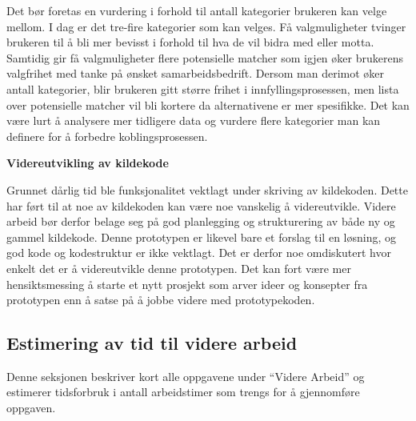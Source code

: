 Det bør foretas en vurdering i forhold til antall kategorier brukeren kan velge mellom. I dag er det tre-fire kategorier som kan velges. Få valgmuligheter tvinger brukeren til å bli mer bevisst i forhold til hva de vil bidra med eller motta. Samtidig gir få valgmuligheter flere potensielle matcher som igjen øker brukerens valgfrihet med tanke på ønsket samarbeidsbedrift. Dersom man derimot øker antall kategorier, blir brukeren gitt større frihet i innfyllingsprosessen, men lista over potensielle matcher vil bli kortere da alternativene er mer spesifikke. Det kan være lurt å analysere mer tidligere data og vurdere flere kategorier man kan definere for å forbedre koblingsprosessen.

{\bf Videreutvikling av kildekode}

Grunnet dårlig tid ble funksjonalitet vektlagt under skriving av kildekoden. Dette har ført til at noe av kildekoden kan være noe vanskelig å videreutvikle. Videre arbeid bør derfor belage seg på god planlegging og strukturering av både ny og gammel kildekode. Denne prototypen er likevel bare et forslag til en løsning, og god kode og kodestruktur er ikke vektlagt. Det er derfor noe omdiskutert hvor enkelt det er å videreutvikle denne prototypen. Det kan fort være mer hensiktsmessing å starte et nytt prosjekt som arver ideer og konsepter fra prototypen enn å satse på å jobbe videre med prototypekoden.

\subsection{Estimering av tid til videre arbeid}

Denne seksjonen beskriver kort alle oppgavene under ``Videre Arbeid'' og estimerer tidsforbruk i antall arbeidstimer som trengs for å gjennomføre oppgaven.

